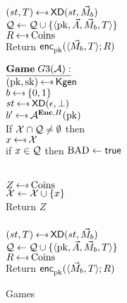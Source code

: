 \begin{figure}[tbhp]
\begin{center}
{\medskip
{}\\
$(st, T) \getsr \mdalg(st,\vmsg_b)$\\
$\mathcal{Q} \gets \mathcal{Q} \cup \{\langle \mathrm{pk},\vec{A},\vec{M}_b,T\rangle\}$\\
$R \getsr \mathrm{Coins}$\\
Return ${\mathsf{enc}}_{\mathrm{pk}}^{}(\langle \vec{M}_b,T\rangle; R)$\\
}
{
$\gamev{G3}{\advA}$\\
 $(\pk,\sk)\getsr\Kgen$\\
$ b \getsr \bits$\\
 $st \getsr \mdalg(\epsilon,\bot)$\\
 $b' \getsr \advA^{\encOracle,H}(\pk)$\\
 If $\mathcal{X} \cap \mathcal{Q} \neq \emptyset$ then \\
\nudge $ x \getsr \calX$\\
\nudge if $x \in \mathcal{Q}$ then $\mathrm{BAD}\gets\textsf{true}$

\medskip
{}\\
  $Z \getsr \mathrm{Coins}$\\
  $\mathcal{X} \gets \mathcal{X} \cup \{x\}$\\
  Return $Z$\\

\medskip
{}\\
$(st, T) \getsr \mdalg(st,\vmsg_b)$\\
$\mathcal{Q} \gets \mathcal{Q} \cup \{\langle \mathrm{pk},\vec{A},\vec{M}_b,T\rangle\}$\\
$R \getsr \mathrm{Coins}$\\
Return ${\mathsf{enc}}_{\mathrm{pk}}^{}(\langle \vec{M}_b,T\rangle; R)$\\
}
\caption{Games}
\label{fig:CPA}
\end{center}
\end{figure}

